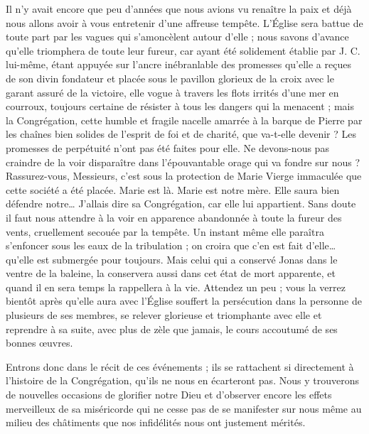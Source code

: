 Il n'y avait encore que peu d'années que nous avions vu renaître la paix et déjà nous allons avoir à vous entretenir d'une affreuse tempête. L'Église sera battue de toute part par les vagues qui s'amoncèlent autour d'elle ; nous savons d'avance qu'elle triomphera de toute leur fureur, car ayant été solidement établie par J. C. lui-même, étant appuyée sur l'ancre inébranlable des promesses qu'elle a reçues de son divin fondateur et placée sous le pavillon glorieux de la croix avec le garant assuré de la victoire, elle vogue à travers les flots irrités d'une mer en courroux, toujours certaine de résister à tous les dangers qui la menacent ; mais la Congrégation, cette humble et fragile nacelle amarrée à la barque de Pierre par les chaînes bien solides de l'esprit de foi et de charité, que va-t-elle devenir ? Les promesses de perpétuité n'ont pas été faites pour elle. Ne devons-nous pas craindre de la voir disparaître dans l'épouvantable orage qui va fondre sur nous ?
Rassurez-vous, Messieurs, c'est sous la protection de Marie Vierge immaculée que cette société a été placée. Marie est là. Marie est notre mère. Elle saura bien défendre notre… J'allais dire sa Congrégation, car elle lui appartient. Sans doute il faut nous attendre à la voir en apparence abandonnée à toute la fureur des vents, cruellement secouée par la tempête. Un instant même elle paraîtra s'enfoncer sous les eaux de la tribulation ; on croira que c'en est fait d'elle… qu'elle est submergée pour toujours. Mais celui qui a conservé Jonas dans le ventre de la baleine, la conservera aussi dans cet état de mort apparente, et quand il en sera temps la rappellera à la vie. Attendez un peu ; vous la verrez bientôt après qu'elle aura avec l'Église souffert la persécution dans la personne de plusieurs de ses membres, se relever glorieuse et triomphante avec elle et reprendre à sa suite, avec plus de zèle que jamais, le cours accoutumé de ses bonnes œuvres.

Entrons donc dans le récit de ces événements ; ils se rattachent si directement à l'histoire de la Congrégation, qu'ils ne nous en écarteront pas. Nous y trouverons de nouvelles occasions de glorifier notre Dieu et d'observer encore les effets merveilleux de sa miséricorde qui ne cesse pas de se manifester sur nous même au milieu des châtiments que nos infidélités nous ont justement mérités.

